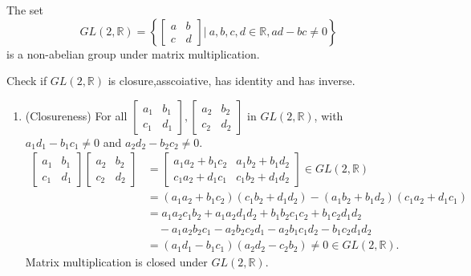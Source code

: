 \begin{example}
    The set 
    \[
        GL(2, \mathbb{R}) = \left\{ \begin{bmatrix}
        a & b \\ c & d
        \end{bmatrix} \bigg \vert \> a,b,c,d \in \mathbb{R}, ad - bc \neq 0 \right\}
    \]
    is a non-abelian group under matrix multiplication.
\end{example}
\begin{solution}
    Check if $GL(2, \mathbb{R})$ is closure,asscoiative, has identity and has inverse.

    \begin{enumerate}
        \item (Closureness) For all $\begin{bmatrix}
            a_1 & b_1 \\ c_1 & d_1
        \end{bmatrix}, \begin{bmatrix}
            a_2 & b_2 \\ c_2 & d_2
        \end{bmatrix}$ in $GL(2, \mathbb{R})$, with $a_1d_1 - b_1c_1 \neq 0$ and $a_2d_2 - b_2c_2 \neq 0$.
        \begin{align*}
            \begin{bmatrix}
                a_1 & b_1 \\ c_1 & d_1
            \end{bmatrix}
            \begin{bmatrix}
                a_2 & b_2 \\ c_2 & d_2
            \end{bmatrix}
            &= \begin{bmatrix}
                a_1a_2 + b_1c_2 & a_1b_2 + b_1d_2 \\ c_1a_2 + d_1c_1 & c_1b_2 + d_1d_2
            \end{bmatrix} \in GL(2, \mathbb{R})\\
            &= (a_1a_2 + b_1c_2)(c_1b_2 + d_1d_2) - (a_1b_2 + b_1d_2)(c_1a_2 + d_1c_1)\\
            &= a_1a_2c_1b_2 + a_1a_2d_1d_2 + b_1b_2c_1c_2 + b_1c_2d_1d_2 \\
            &\quad - a_1a_2b_2c_1 - a_2b_2c_2d_1 - a_2b_1c_1d_2 - b_1c_2d_1d_2\\[0.3em]
            &= (a_1d_1 - b_1c_1)(a_2d_2 - c_2b_2) \neq 0 \in GL(2, \mathbb{R}).
        \end{align*}
        Matrix multiplication is closed under $GL(2, \mathbb{R})$.


\end{enumerate}
\end{solution}
